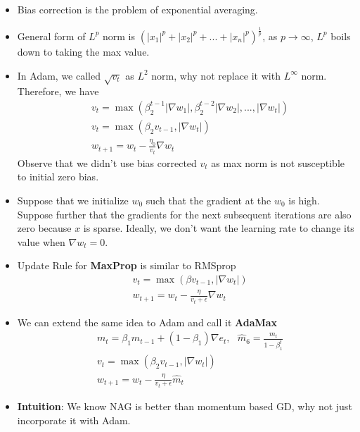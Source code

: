 \documentclass[a4paper]{article}
\begin{document}
\begin{itemize}
    \item Bias correction is the problem of exponential averaging.
    \item General form of $L^p$ norm is $(|x_1|^p+|x_2|^p+...+|x_n|^p)^{\frac{1}{p}}$, as $p\to \infty$, $L^p$ boils down to taking the max value.
    \item In Adam, we called $\sqrt{v_t}$ as $L^2$ norm, why not replace it with $L^{\infty}$ norm. Therefore, we have
    \begin{equation*}
        \begin{split}
            &v_t = \max(\beta_2^{t-1}|\nabla w_1|, \beta_2^{t-2}|\nabla w_2|, ..., |\nabla w_t|)\\
            &v_t = \max(\beta_2v_{t-1}, |\nabla w_t|)\\
            &w_{t+1} = w_t-\frac{\eta_0}{v_t}\nabla w_t
        \end{split}
    \end{equation*}
    Observe that we didn't use bias corrected $v_t$ as max norm is not susceptible to initial zero bias.
    \item Suppose that we initialize $w_0$ such that the gradient at the $w_0$ is high. Suppose further that the gradients for the next subsequent iterations are also zero because $x$ is sparse. Ideally, we don't want the learning rate to change its value when $\nabla w_t=0$.
    \item Update Rule for \textbf{MaxProp} is similar to RMSprop
    \begin{equation*}
        \begin{split}
            &v_t = \max(\beta v_{t-1}, |\nabla w_t|)\\
            &w_{t+1} = w_t - \frac{\eta}{v_t+\epsilon}\nabla w_t
        \end{split}
    \end{equation*}
    \item We can extend the same idea to Adam and call it \textbf{AdaMax}
    \begin{equation*}
        \begin{split}
            &m_t = \beta_1m_{t-1} + (1-\beta_1)\nabla e_t,\text{   }\hat{m}_6 = \frac{m_t}{1-\beta_1^t}\\
            &v_t = \max(\beta_2v_{t-1}, |\nabla w_t|)\\
            &w_{t+1} = w_t-\frac{\eta}{v_t+\epsilon}\hat{m}_t
        \end{split}
    \end{equation*}
    \item \textbf{Intuition}: We know NAG is better than momentum based GD, why not just incorporate it with Adam.

\end{itemize}
\end{document}
